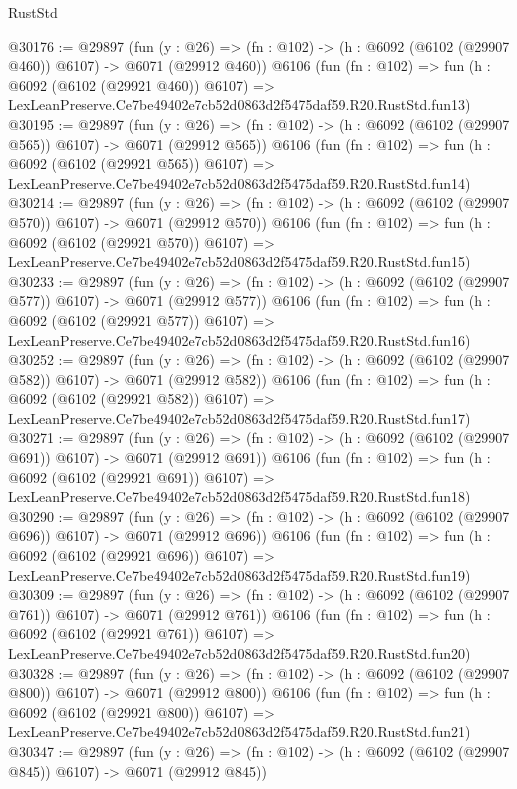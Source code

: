 \begin{lexlean}{RustStd}
\begin{coremodule}
@30176 := @29897
    (fun (y : @26) => (fn : @102) -> (h : @6092 (@6102 (@29907 @460)) @6107) -> @6071 (@29912 @460))
    @6106
    (fun (fn : @102) =>
    fun (h : @6092 (@6102 (@29921 @460)) @6107) =>
    LexLeanPreserve.Ce7be49402e7cb52d0863d2f5475daf59.R20.RustStd.fun13)
@30195 := @29897
    (fun (y : @26) => (fn : @102) -> (h : @6092 (@6102 (@29907 @565)) @6107) -> @6071 (@29912 @565))
    @6106
    (fun (fn : @102) =>
    fun (h : @6092 (@6102 (@29921 @565)) @6107) =>
    LexLeanPreserve.Ce7be49402e7cb52d0863d2f5475daf59.R20.RustStd.fun14)
@30214 := @29897
    (fun (y : @26) => (fn : @102) -> (h : @6092 (@6102 (@29907 @570)) @6107) -> @6071 (@29912 @570))
    @6106
    (fun (fn : @102) =>
    fun (h : @6092 (@6102 (@29921 @570)) @6107) =>
    LexLeanPreserve.Ce7be49402e7cb52d0863d2f5475daf59.R20.RustStd.fun15)
@30233 := @29897
    (fun (y : @26) => (fn : @102) -> (h : @6092 (@6102 (@29907 @577)) @6107) -> @6071 (@29912 @577))
    @6106
    (fun (fn : @102) =>
    fun (h : @6092 (@6102 (@29921 @577)) @6107) =>
    LexLeanPreserve.Ce7be49402e7cb52d0863d2f5475daf59.R20.RustStd.fun16)
@30252 := @29897
    (fun (y : @26) => (fn : @102) -> (h : @6092 (@6102 (@29907 @582)) @6107) -> @6071 (@29912 @582))
    @6106
    (fun (fn : @102) =>
    fun (h : @6092 (@6102 (@29921 @582)) @6107) =>
    LexLeanPreserve.Ce7be49402e7cb52d0863d2f5475daf59.R20.RustStd.fun17)
@30271 := @29897
    (fun (y : @26) => (fn : @102) -> (h : @6092 (@6102 (@29907 @691)) @6107) -> @6071 (@29912 @691))
    @6106
    (fun (fn : @102) =>
    fun (h : @6092 (@6102 (@29921 @691)) @6107) =>
    LexLeanPreserve.Ce7be49402e7cb52d0863d2f5475daf59.R20.RustStd.fun18)
@30290 := @29897
    (fun (y : @26) => (fn : @102) -> (h : @6092 (@6102 (@29907 @696)) @6107) -> @6071 (@29912 @696))
    @6106
    (fun (fn : @102) =>
    fun (h : @6092 (@6102 (@29921 @696)) @6107) =>
    LexLeanPreserve.Ce7be49402e7cb52d0863d2f5475daf59.R20.RustStd.fun19)
@30309 := @29897
    (fun (y : @26) => (fn : @102) -> (h : @6092 (@6102 (@29907 @761)) @6107) -> @6071 (@29912 @761))
    @6106
    (fun (fn : @102) =>
    fun (h : @6092 (@6102 (@29921 @761)) @6107) =>
    LexLeanPreserve.Ce7be49402e7cb52d0863d2f5475daf59.R20.RustStd.fun20)
@30328 := @29897
    (fun (y : @26) => (fn : @102) -> (h : @6092 (@6102 (@29907 @800)) @6107) -> @6071 (@29912 @800))
    @6106
    (fun (fn : @102) =>
    fun (h : @6092 (@6102 (@29921 @800)) @6107) =>
    LexLeanPreserve.Ce7be49402e7cb52d0863d2f5475daf59.R20.RustStd.fun21)
@30347 := @29897
    (fun (y : @26) => (fn : @102) -> (h : @6092 (@6102 (@29907 @845)) @6107) -> @6071 (@29912 @845))

\end{coremodule}
\end{lexlean}
